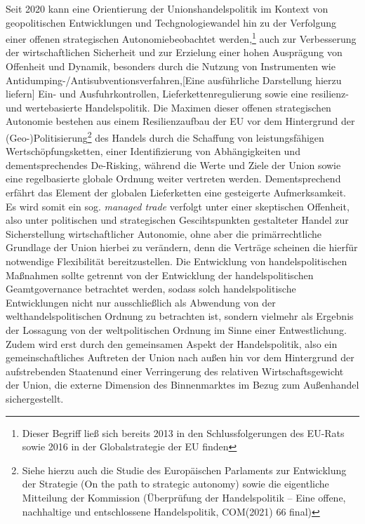 \documentclass[12pt,a4paper,oneside]{book} %
\begin{document}
Seit 2020 kann eine Orientierung der Unionshandelspolitik im Kontext von geopolitischen Entwicklungen und Techgnologiewandel hin zu der Verfolgung einer \glqq offenen strategischen Autonomie\grqq beobachtet werden,\footnote{Dieser Begriff ließ sich bereits 2013 in den Schlussfolgerungen des EU-Rats sowie 2016 in der Globalstrategie der EU finden} auch zur Verbesserung der wirtschaftlichen Sicherheit und zur Erzielung einer hohen Ausprägung von Offenheit und Dynamik, besonders durch die Nutzung von Instrumenten wie Antidumping-/Antisubventionsverfahren,[Eine ausführliche Darstellung hierzu liefern]\autocite{Müller-Ibold/Herrmann, EuZW 2022, 1085} Ein- und Ausfuhrkontrollen, Lieferkettenregulierung sowie eine resilienz- und wertebasierte Handelspolitik.\autocite{Paschke, RdTW 2024, 206; Schäffer/Hach, ZRP 2023, 207f; Müller-Ibold, EuZW 2022, 1029, 1034} Die Maximen dieser offenen strategischen Autonomie bestehen aus einem Resilienzaufbau der EU vor dem Hintergrund der (Geo-)Politisierung\footnote{Siehe hierzu auch die Studie des Europäischen Parlaments zur Entwicklung der Strategie (On the path to \glq strategic autonomy\grq) sowie die eigentliche Mitteilung der Kommission (\glqq Überprüfung der Handelspolitik -- Eine offene, nachhaltige und entschlossene Handelspolitik\grqq, COM(2021) 66 final)} des Handels durch die Schaffung von leistungsfähigen Wertschöpfungsketten, einer Identifizierung von Abhängigkeiten und dementsprechendes De-Risking, während die Werte und Ziele der Union sowie eine regelbasierte globale Ordnung weiter vertreten werden.\autocite{Schäffer/hach, ZRP 2023, 207} Dementsprechend erfährt das Element der globalen Lieferketten eine gesteigerte Aufmerksamkeit.\autocite{bibid} Es wird somit ein sog. \textit{managed trade} verfolgt unter einer \glqq skeptischen Offenheit\grqq, also unter politischen und strategischen Gescihtspunkten gestalteter Handel zur Sicherstellung wirtschaftlicher Autonomie, ohne aber die primärrechtliche Grundlage der Union hierbei zu verändern, denn die Verträge scheinen die hierfür notwendige Flexibilität bereitzustellen.\autocite[so zumindest]{Paschke, RdTW 2024, 206, 216; Schäffer, EuZW 2023, 695, 700} Die Entwicklung von handelspolitischen Maßnahmen sollte getrennt von der Entwicklung der handelspolitischen Geamtgovernance betrachtet werden, sodass solch handelspolitische Entwicklungen nicht nur ausschließlich als Abwendung von der welthandelspolitischen Ordnung zu betrachten ist, sondern vielmehr als Ergebnis der Lossagung von der weltpolitischen Ordnung im Sinne einer \glqq Entwestlichung\grqq.\autocite{Altemöller, EuZW 2019, 321ff} Zudem wird erst durch den gemeinsamen Aspekt der Handelspolitik, also ein gemeinschaftliches Auftreten der Union nach außen hin vor dem Hintergrund der \glqq aufstrebenden Staaten\grqq und einer Verringerung des relativen Wirtschaftsgewicht der Union, die externe Dimension des Binnenmarktes im Bezug zum Außenhandel sichergestellt.\autocite{Callies/Ruffert, Art. 206 AEUV, Rn. 3; Art. 207 Rn. 3; EuGH, Gutachten 1/75, Slg. 1975, 1355, S. 1363 f.}
\end{document}
